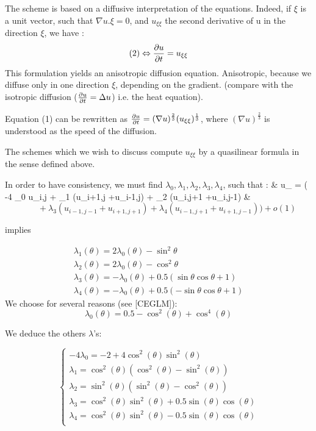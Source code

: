 The scheme is based on a diffusive interpretation of the equations.
Indeed, if $\xi$ is a unit vector, such that $\nabla u . \xi = 0$,
and $u_{\xi\xi}$ the second derivative of u in the direction $\xi$,
we have :
$$ (2) \equi& \ut& = u_{\xi\xi} $$
This formulation yields an anisotropic diffusion equation. Anisotropic,
because we diffuse only in one direction $\xi$, depending on the gradient.
(compare with the isotropic diffusion ($\ut& = \Delta u$) i.e. the
heat equation).

Equation (1) can be rewritten as
$ \ut& = ( \nabla u )^{\frac{2}{3}} (u_{\xi\xi})^{\frac{1}{3}} $,
where $( \nabla u )^{\frac{2}{3}}$ is understood as the speed of the diffusion.


The schemes which we wish to discuss compute $u_{\xi\xi}$ by a quasilinear formula in the sense defined above.

\skipaline
In order to have consistency, we must find $\lambda_0 , \lambda_1 , \lambda_2 ,
\lambda_3, \lambda_4$, such that :
\fb& \label{KKK}
u_{\xi\xi} =  ( -4 \lambda_0 u_{i,j} + \lambda_1 (u_{i+1,j}
+u_{i-1,j}) + \lambda_2 (u_{i,j+1} +u_{i,j-1})
\fe&
$$
    \qquad + \lambda_3 (u_{i-1,j-1} +u_{i+1,j+1}) +\lambda_4 (u_{i-1,j+1} +u_{i+
1,j-1}))
+o(1)
$$

\CONS implies

$$
\begin{array}{l}
 \lambda_1(\theta) = 2 \lambda_0(\theta) - \sin^2\theta \\
 \lambda_2(\theta) = 2 \lambda_0(\theta) - \cos^2\theta \\
 \lambda_3(\theta) = - \lambda_0(\theta) + 0.5(\sin \theta \cos \theta + 1) \\
 \lambda_4(\theta) = - \lambda_0(\theta) + 0.5(-\sin \theta \cos \theta + 1) 
 \end{array}
$$
We choose for several reasons (see [CEGLM]):
$$ \lambda_0(\theta) = 0.5 - \cos^2(\theta) +\cos^4(\theta) $$

We deduce the others $\lambda$'s:

$$
\left\{
\begin{array}{l}
-4 \lambda_0 = -2 + 4 \cos^2(\theta)\sin^2(\theta) \\
\lambda_1 = \cos^2(\theta) (\cos^2(\theta) - \sin^2(\theta)) \\
\lambda_2 = \sin^2(\theta) (\sin^2(\theta) - \cos^2(\theta)) \\
\lambda_3 = \cos^2(\theta)\sin^2(\theta) + 0.5 \sin(\theta)\cos(\theta) \\
\lambda_4 = \cos^2(\theta)\sin^2(\theta) - 0.5 \sin(\theta)\cos(\theta) \\
\end{array}
\right.
$$


